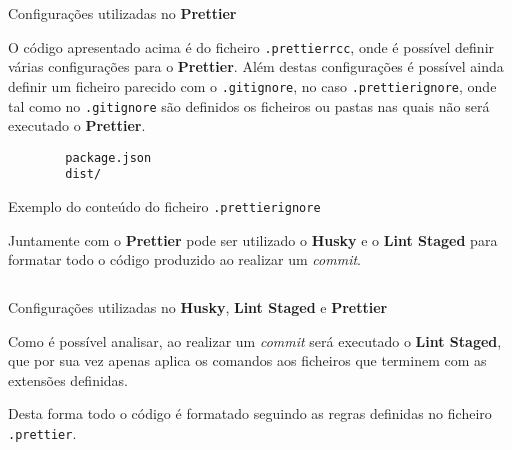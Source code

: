 \label{prettierAttachments}


\begin{longlisting}
	\inputminted{json}{code/prettier/config.json}
	\caption{Configurações utilizadas no \textbf{Prettier}}
\end{longlisting}

O código apresentado acima é do ficheiro \verb|.prettierrcc|, onde é possível definir várias configurações para o \textbf{Prettier}. Além destas configurações é possível ainda definir um ficheiro parecido com o \verb|.gitignore|, no caso \verb|.prettierignore|, onde tal como no \verb|.gitignore| são definidos os ficheiros ou pastas nas quais não será executado o \textbf{Prettier}.

\begin{longlisting}
	\begin{verbatim}
		package.json
		dist/
	\end{verbatim}
	\caption{Exemplo do conteúdo do ficheiro \texttt{.prettierignore}}
\end{longlisting}



Juntamente com o \textbf{Prettier} pode ser utilizado o \textbf{Husky} e o \textbf{Lint Staged} para formatar todo o código produzido ao realizar um \textit{commit}.

\begin{longlisting}
	\inputminted{json}{code/prettier/husky.json}
	\caption{Configurações utilizadas no \textbf{Husky}, \textbf{Lint Staged} e \textbf{Prettier}}
\end{longlisting}

Como é possível analisar, ao realizar um \textit{commit} será executado o \textbf{Lint Staged}, que por sua vez apenas aplica os comandos aos ficheiros que terminem com as extensões definidas.

Desta forma todo o código é formatado seguindo as regras definidas no ficheiro \verb|.prettier|.